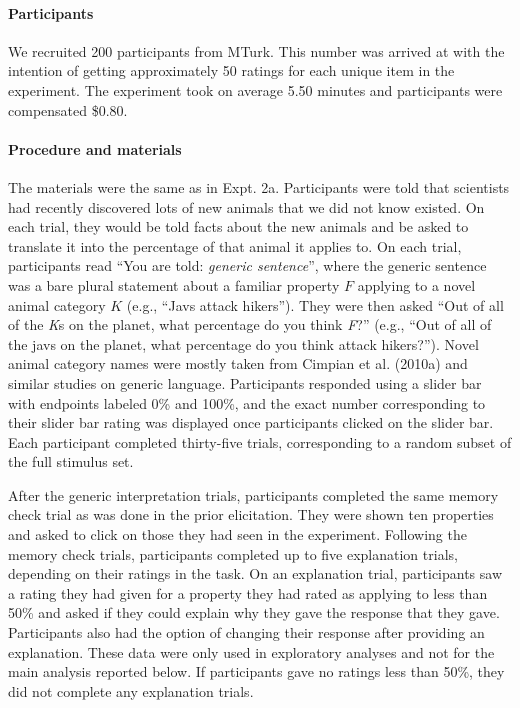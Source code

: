 \documentclass[,man,floatsintext]{apa6}
\let\oldparagraph\paragraph
\renewcommand{\paragraph}[1]{\oldparagraph{#1}\mbox{}}
\theoremstyle{definition}
\theoremstyle{definition}
\theoremstyle{definition}
\theoremstyle{remark}
\begin{document}
\hypertarget{participants-3}{%
\paragraph{Participants}\label{participants-3}}

We recruited 200 participants from MTurk. This number was arrived at
with the intention of getting approximately 50 ratings for each unique
item in the experiment. The experiment took on average 5.50 minutes and
participants were compensated \$0.80.

\hypertarget{procedure-and-materials-3}{%
\paragraph{Procedure and materials}\label{procedure-and-materials-3}}

The materials were the same as in Expt. 2a. Participants were told that
scientists had recently discovered lots of new animals that we did not
know existed. On each trial, they would be told facts about the new
animals and be asked to translate it into the percentage of that animal
it applies to. On each trial, participants read \enquote{You are told:
\emph{generic sentence}}, where the generic sentence was a bare plural
statement about a familiar property \(F\) applying to a novel animal
category \(K\) (e.g., \enquote{Javs attack hikers}). They were then
asked \enquote{Out of all of the \emph{K}s on the planet, what
percentage do you think \emph{F}?} (e.g., \enquote{Out of all of the
javs on the planet, what percentage do you think attack hikers?}). Novel
animal category names were mostly taken from Cimpian et al. (2010a) and
similar studies on generic language. Participants responded using a
slider bar with endpoints labeled 0\% and 100\%, and the exact number
corresponding to their slider bar rating was displayed once participants
clicked on the slider bar. Each participant completed thirty-five
trials, corresponding to a random subset of the full stimulus set.

After the generic interpretation trials, participants completed the same
memory check trial as was done in the prior elicitation. They were shown
ten properties and asked to click on those they had seen in the
experiment. Following the memory check trials, participants completed up
to five explanation trials, depending on their ratings in the task. On
an explanation trial, participants saw a rating they had given for a
property they had rated as applying to less than 50\% and asked if they
could explain why they gave the response that they gave. Participants
also had the option of changing their response after providing an
explanation. These data were only used in exploratory analyses and not
for the main analysis reported below. If participants gave no ratings
less than 50\%, they did not complete any explanation trials.
\end{document}
